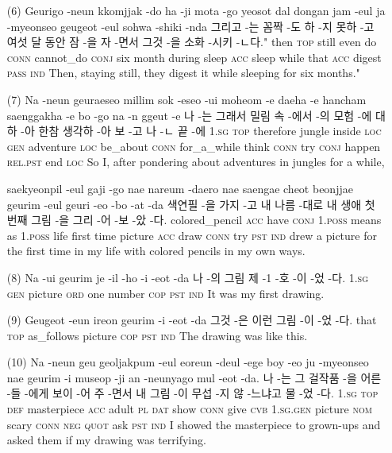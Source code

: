 \begin{itemize}
\item [(6)]
\tgl
		{Geurigo -neun kkomjjak -do ha -ji mota -go yeosot dal dongan jam -eul ja -myeonseo geugeot -eul sohwa -shiki -nda}
		{그리고 -는 꼼짝 -도 하 -지 못하 -고 여섯 달 동안 잠 -을 자 -면서 그것 -을 소화 -시키 -ㄴ다."}
		{then \textsc{top} still even do \textsc{conn} cannot\_do \textsc{conj} six month during sleep \textsc{acc} sleep while that \textsc{acc} digest \textsc{pass} \textsc{ind}}
		{Then, staying still, they digest it while sleeping for six months."}

\item [(7)]
\tgl
		{Na -neun geuraeseo millim sok -eseo -ui moheom -e daeha -e hancham saenggakha -e bo -go na -n ggeut -e}
		{나 -는 그래서 밀림 속 -에서 -의 모험 -에 대하 -아 한참 생각하 -아 보 -고 나 -ㄴ 끝 -에}
		{\textsc{1.sg} \textsc{top} therefore jungle inside \textsc{loc} \textsc{gen} adventure \textsc{loc} be\_about \textsc{conn} for\_a\_while think \textsc{conn} try \textsc{conj} happen \textsc{rel.pst} end \textsc{loc}}
		{So I, after pondering about adventures in jungles for a while,}
		
\tgl
		{saekyeonpil -eul gaji -go nae nareum -daero nae saengae cheot beonjjae geurim -eul geuri -eo -bo -at -da}
		{색연필 -을 가지 -고 내 나름 -대로 내 생애 첫 번째 그림 -을 그리 -어 -보 -았 -다.}
		{colored\_pencil \textsc{acc} have \textsc{conj} \textsc{1.poss} means as \textsc{1.poss} life first time picture \textsc{acc} draw \textsc{conn} try \textsc{pst} \textsc{ind}}
		{drew a picture for the first time in my life with colored pencils in my own ways.}

\item [(8)]
\tgl
		{Na -ui geurim je -il -ho -i -eot -da}
		{나 -의 그림 제 -1 -호 -이 -었 -다.}
		{\textsc{1.sg} \textsc{gen} picture \textsc{ord} one number \textsc{cop} \textsc{pst} \textsc{ind}}
		{It was my first drawing.}

\item [(9)]
\tgl
		{Geugeot -eun ireon geurim -i -eot -da}
		{그것 -은 이런 그림 -이 -었 -다.}
		{that \textsc{top} as\_follows picture \textsc{cop} \textsc{pst} \textsc{ind}}
		{The drawing was like this.}

\item [(10)]
\tgl
		{Na -neun geu geoljakpum -eul eoreun -deul -ege boy -eo ju -myeonseo nae geurim -i museop -ji an -neunyago mul -eot -da.}
		{나 -는 그 걸작품 -을 어른 -들 -에게 보이 -어 주 -면서 내 그림 -이 무섭 -지 않 -느냐고 물 -었 -다.}
		{\textsc{1.sg} \textsc{top} \textsc{def} masterpiece \textsc{acc} adult \textsc{pl} \textsc{dat} show \textsc{conn} give \textsc{cvb} \textsc{1.sg.gen} picture \textsc{nom} scary \textsc{conn} \textsc{neg} \textsc{quot} ask \textsc{pst} \textsc{ind}}
		{I showed the masterpiece to grown-ups and asked them if my drawing was terrifying.}


\end{itemize}
